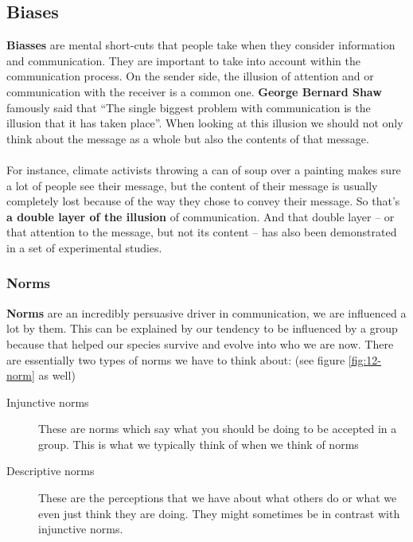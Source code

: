 \documentclass[../summary.tex]{subfiles}
\begin{document}
		\subsection{Biases}
			\textbf{Biasses} are mental short-cuts that people take when they consider information and communication. They are important to take into account within the communication process. On the sender side, the illusion of attention and or communication with the receiver is a common one. \textbf{George Bernard Shaw} famously said that ``The single biggest problem with communication is the illusion that it has taken place''. When looking at this illusion we should not only think about the message as a whole but also the contents of that message. \\
			\\
			For instance, climate activists throwing a can of soup over a painting makes sure a lot of people see their message, but the content of their message is usually completely lost because of the way they  chose to convey their message.  So that's \textbf{a double layer of the illusion} of communication. And that double layer -- or that attention to the message, but not its content -- has also been demonstrated in a set of experimental studies. 
			
			\subsubsection{Norms}
				\textbf{Norms} are an incredibly persuasive driver in communication, we are influenced a lot by them. This can be explained by our tendency  to be influenced by a group because that helped our species survive and evolve into who we are now. There are essentially two types of norms we have to think about: (see figure \ref{fig:12-norm} as well)
				\begin{description}
					\item[Injunctive norms] These are norms which say what you should be doing to be accepted in a group. This is what we typically think of when we think of norms
					\item[Descriptive norms] These are the perceptions that we have about what others do or what we even just think they are doing. They might sometimes be in contrast with injunctive norms. 
				\end{description}
				
\end{document}

